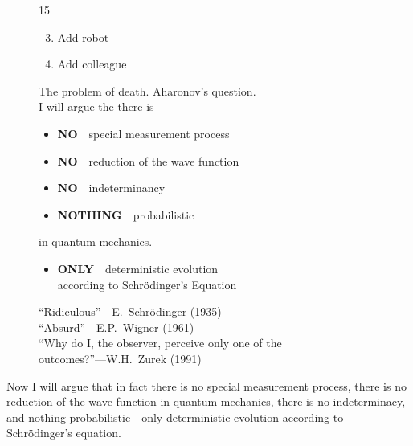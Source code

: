 \documentclass[12pt,nofootinbib]{revtex4}
\begin{document}
\begin{figure}[htb] 
\begin{mdframed}
  \vspace{5pt}\hfill 15\\[-18pt]
  \begin{raggedright}
  \begin{enumerate}[label={(\arabic*)}]\setcounter{enumi}{2}
    \item Add robot
    \item Add colleague\\[5pt]
  \end{enumerate}

    The problem of death. %
    Aharonov's question.\\[\baselineskip]
    I will argue the there is
    \begin{itemize}[label={}]
    \item {\bf NO}\ \ special measurement process  
    \item {\bf NO}\ \ reduction of the wave function 
    \item {\bf NO}\ \ indeterminancy
    \item {\bf NOTHING}\ \ probabilistic
    \end{itemize}
    in quantum mechanics.
    \begin{itemize}[label={}]
    \item {\bf ONLY}\ \ deterministic evolution\\ %
      \hspace{33pt} according to Schrödinger's Equation\\[10pt]
    \end{itemize}

    ``Ridiculous''---E.~Schrödinger (1935) \\[0.5\baselineskip]

    ``Absurd''---E.P.~Wigner (1961) \\[0.5\baselineskip]

    ``Why do I, the observer, perceive only one of the\\ outcomes?''---W.H.~Zurek (1991)
  \end{raggedright}

\vspace{0.5\baselineskip}
\end{mdframed}
\end{figure}

Now I will argue that in fact there is no special measurement process, there is no reduction of the wave function in quantum mechanics, there is no indeterminacy, and nothing probabilistic---only deterministic evolution according to Schrödinger's equation.
\end{document}
